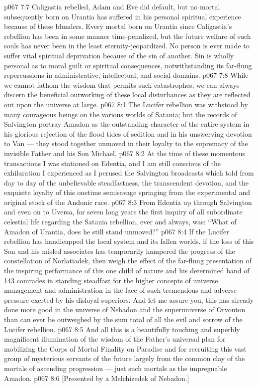 \vs p067 7:7 Caligastia rebelled, Adam and Eve did default, but no mortal subsequently born on Urantia has suffered in his personal spiritual experience because of these blunders. Every mortal born on Urantia since Caligastia’s rebellion has been in some manner time\hyp{}penalized, but the future welfare of such souls has never been in the least eternity\hyp{}jeopardized. No person is ever made to suffer vital spiritual deprivation because of the sin of another. Sin is wholly personal as to moral guilt or spiritual consequences, notwithstanding its far\hyp{}flung repercussions in administrative, intellectual, and social domains.
\vs p067 7:8 \pc While we cannot fathom the wisdom that permits such catastrophes, we can always discern the beneficial outworking of these local disturbances as they are reflected out upon the universe at large.
\vs p067 8:1 The Lucifer rebellion was withstood by many courageous beings on the various worlds of Satania; but the records of Salvington portray Amadon as the outstanding character of the entire system in his glorious rejection of the flood tides of sedition and in his unswerving devotion to Van --- they stood together unmoved in their loyalty to the supremacy of the invisible Father and his Son Michael.
\vs p067 8:2 At the time of these momentous transactions I was stationed on Edentia, and I am still conscious of the exhilaration I experienced as I perused the Salvington broadcasts which told from day to day of the unbelievable steadfastness, the transcendent devotion, and the exquisite loyalty of this onetime semisavage springing from the experimental and original stock of the Andonic race.
\vs p067 8:3 From Edentia up through Salvington and even on to Uversa, for seven long years the first inquiry of all subordinate celestial life regarding the Satania rebellion, ever and always, was: “What of Amadon of Urantia, does he still stand unmoved?”
\vs p067 8:4 If the Lucifer rebellion has handicapped the local system and its fallen worlds, if the loss of this Son and his misled associates has temporarily hampered the progress of the constellation of Norlatiadek, then weigh the effect of the far\hyp{}flung presentation of the inspiring performance of this one child of nature and his determined band of 143 comrades in standing steadfast for the higher concepts of universe management and administration in the face of such tremendous and adverse pressure exerted by his disloyal superiors. And let me assure you, this has already done more good in the universe of Nebadon and the superuniverse of Orvonton than can ever be outweighed by the sum total of all the evil and sorrow of the Lucifer rebellion.
\vs p067 8:5 And all this is a beautifully touching and superbly magnificent illumination of the wisdom of the Father’s universal plan for mobilizing the Corps of Mortal Finality on Paradise and for recruiting this vast group of mysterious servants of the future largely from the common clay of the mortals of ascending progression --- just such mortals as the impregnable Amadon.
\vsetoff
\vs p067 8:6 [Presented by a Melchizedek of Nebadon.]
\quizlink
